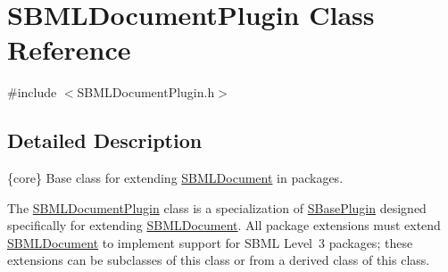 \hypertarget{class_s_b_m_l_document_plugin}{}\section{S\+B\+M\+L\+Document\+Plugin Class Reference}
\label{class_s_b_m_l_document_plugin}


{\ttfamily \#include $<$S\+B\+M\+L\+Document\+Plugin.\+h$>$}



\subsection{Detailed Description}
\{core\} Base class for extending \hyperlink{class_s_b_m_l_document}{S\+B\+M\+L\+Document} in packages.



The \hyperlink{class_s_b_m_l_document_plugin}{S\+B\+M\+L\+Document\+Plugin} class is a specialization of \hyperlink{class_s_base_plugin}{S\+Base\+Plugin} designed specifically for extending \hyperlink{class_s_b_m_l_document}{S\+B\+M\+L\+Document}. All package extensions must extend \hyperlink{class_s_b_m_l_document}{S\+B\+M\+L\+Document} to implement support for S\+B\+ML Level~3 packages; these extensions can be subclasses of this class or from a derived class of this class.

